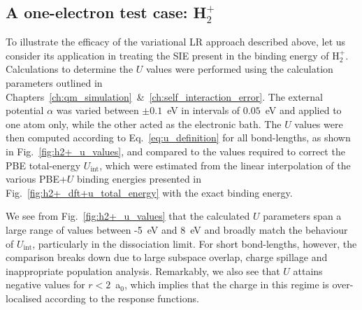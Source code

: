 \subsection{A one-electron test case: H$_2^+$}

To illustrate the efficacy of the 
variational LR approach described above, 
let us consider its application 
in treating the SIE present in the 
binding energy of H$_2^+$.
%
Calculations to determine the $U$ values 
were performed using the 
calculation parameters outlined in 
Chapters~\ref{ch:qm_simulation}~\&~\ref{ch:self_interaction_error}.
% 
The external potential $\alpha$ 
was varied between $\pm 0.1$~eV 
in intervals of $0.05$~eV 
and applied to one atom only, 
while the other acted as the electronic bath.
%
The $U$ values were then computed 
according to Eq.~\eqref{eq:u_definition} 
for all bond-lengths,  
as shown in Fig.~\ref{fig:h2+_u_values}, 
and compared to the values required to correct 
the PBE total-energy $U_\textrm{int}$,  
which were estimated from the linear interpolation 
of the various PBE+$U$ binding energies  
presented in Fig.~\ref{fig:h2+_dft+u_total_energy} 
with the exact binding energy.
%

We see from Fig.~\ref{fig:h2+_u_values} 
that the calculated $U$ parameters  
span a large range of values between -5~eV and 8~eV 
and broadly match the behaviour of $U_\textrm{int}$, 
particularly in the dissociation limit.
%
For short bond-lengths, however,
the comparison breaks down 
due to large subspace overlap, 
charge spillage and inappropriate population analysis.
%
Remarkably, 
we also see that $U$ attains negative values for $r<2$~a$_0$, 
which implies that the charge in this regime is over-localised 
according to the response functions.

